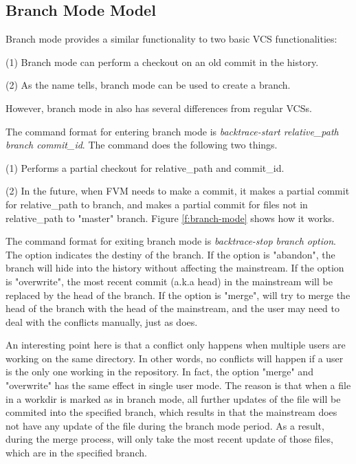 \subsection{Branch Mode Model}

Branch mode provides a similar functionality to two basic VCS functionalities:

(1) Branch mode can perform a checkout on an old commit in the history.

(2) As the name tells, branch mode can be used to create a branch.

However, branch mode in \sys also has several differences from regular VCSs.

The command format for entering branch mode is \textit{backtrace-start relative\_path
branch commit\_id}. The command does the following two things.

(1) Performs a partial checkout for relative\_path and commit\_id.

(2) In the future, when FVM needs to make a commit, it makes a partial
commit for relative\_path to branch, and makes a partial commit for files
not in relative\_path to "master" branch. Figure \ref{f:branch-mode} shows how
it works.

The command format for exiting branch mode is \textit{backtrace-stop branch
option}. The option indicates the destiny of the branch. If the option is
"abandon", the branch will hide into the history without affecting the
mainstream. If the option is "overwrite", the most recent
commit (a.k.a head) in the mainstream will be replaced by the head of the
branch. If the option is "merge", \sys will try to merge the head of the branch
with the head of the mainstream, and the user may need to deal with the
conflicts manually, just as \git does.

An interesting point here is that a conflict only happens when multiple users
are working on the same directory. In other words, no conflicts will happen if a
user is the only one working in the repository. In fact, the option "merge" and
"overwrite" has the same effect in single user mode. The reason is that when a
file in a workdir is marked as in branch mode, all further updates of the file
will be commited into the specified branch, which results in that the mainstream
does not have any update of the file during the branch mode period. As a result,
during the merge process, \sys will only take the most recent update of those
files, which are in the specified branch.

